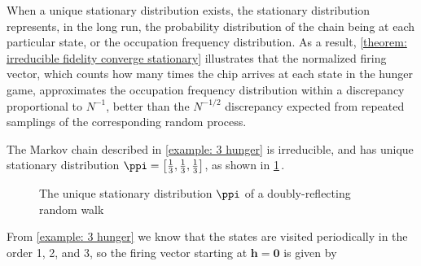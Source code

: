 When a unique stationary distribution exists, 
the stationary distribution represents, in the long run, 
the probability distribution of the chain being at each particular state, 
or the occupation frequency distribution.
As a result, \cref{theorem: irreducible fidelity converge stationary} 
illustrates that the normalized firing vector, 
which counts how many times the chip arrives at each state in the hunger game, 
approximates the occupation frequency distribution 
within a discrepancy proportional to $N^{-1}$, 
better than the $N^{-1/2}$ discrepancy expected 
from repeated samplings of the corresponding random process.

\begin{example}\label{example: stationary distribution}
The Markov chain described in \cref{example: 3 hunger} is irreducible, 
and has unique stationary distribution 
$\ppi=\left[\frac{1}{3},\frac{1}{3},\frac{1}{3}\right]$, 
as shown in \cref{fig:ex stationary}\,.
\begin{figure}[htbp]
    \centering
    \caption{The unique stationary distribution $\ppi$ of a doubly-reflecting random walk}
    \label{fig:ex stationary}
\end{figure}
From \cref{example: 3 hunger} we know that 
the states are visited periodically in the order 1, 2, and 3, 
so the firing vector starting at $\mathbf{h}=\mathbf{0}$ is given by
\begin{align*}

\end{align*}
\end{example}
